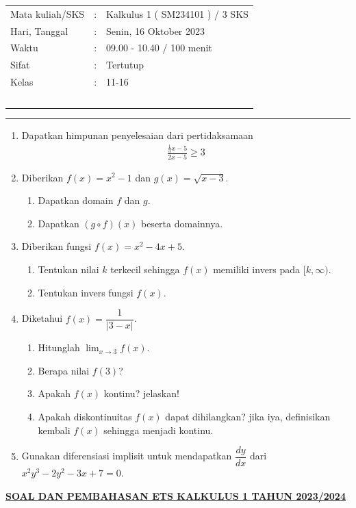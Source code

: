 \documentclass[10pt,openany,a4paper]{article}
\theoremstyle{definition}
\theoremstyle{definition}
\theoremstyle{plain}
\begin{document}
    \begin{center}
	\begin{tabular}{lcl}
		Mata kuliah/SKS & : & Kalkulus 1 ( SM234101 ) / 3 SKS\\
		Hari, Tanggal & : & Senin, 16 Oktober 2023\\
		Waktu & : & 09.00 - 10.40 / 100 menit\\
		Sifat & : & Tertutup\\
		Kelas & : & 11-16\\
  ~
	\end{tabular}

    \noindent\rule{\textwidth}{2.pt}
        \end{center}
    \begin{enumerate}
    \item Dapatkan himpunan penyelesaian dari pertidaksamaan
    \begin{align*}
        \frac{\frac{1}{3}x-5}{2x-5}\geq 3
    \end{align*}

    \item Diberikan $f(x)=x^2-1$ dan $g(x)=\sqrt{x-3}$.
    \begin{enumerate}
        \item Dapatkan domain $f$ dan $g$.
        \item Dapatkan $(g\circ f)(x)$ beserta domainnya.
    \end{enumerate}

    \item Diberikan fungsi $f(x)=x^2-4x+5$.
    \begin{enumerate}
        \item Tentukan nilai $k$ terkecil sehingga $f(x)$ memiliki invers pada $[k,\infty)$.
        \item Tentukan invers fungsi $f(x)$.
    \end{enumerate}

    \item Diketahui $f(x)=\dfrac{1}{|3-x|}$.
    \begin{enumerate}
        \item Hitunglah $\displaystyle\lim_{x\to 3}f(x)$.
        \item Berapa nilai $f(3)$?
        \item Apakah $f(x)$ kontinu? jelaskan!
        \item Apakah diskontinuitas $f(x)$ dapat dihilangkan? jika iya, definisikan kembali $f(x)$ sehingga menjadi kontinu.
    \end{enumerate}

    \item Gunakan diferensiasi implisit untuk mendapatkan $\dfrac{dy}{dx}$ dari $x^2y^3-2y^2-3x+7=0$.
\end{enumerate}
\newpage
 \begin{center}
	{\underline{\textbf{\MakeUppercase{Soal dan Pembahasan ETS Kalkulus 1 Tahun 2023/2024}}}}
    \end{center}
\end{document}
